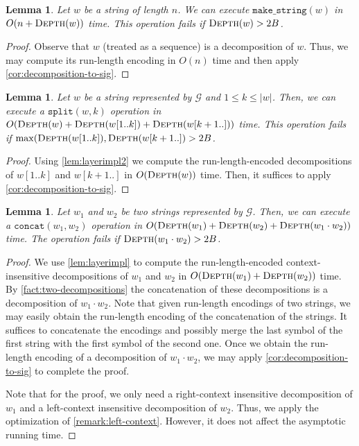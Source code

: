 \documentclass[a4paper]{article}
\newtheorem{lemma}[theorem]{Lemma}
\theoremstyle{remark}
\newcommand{\makeop}{\mathtt{make\_string}}
\newcommand{\concop}{\mathtt{concat}}
\newcommand{\splitop}{\mathtt{split}}
\newcommand{\depth}{\textsc{Depth}}
\newcommand{\str}{w}
\newcommand{\grammar}{\mathcal{G}}
\newcommand{\mword}{B}
\begin{document}
\begin{lemma}\label{lem:makeop}
Let $w$ be a string of length $n$.
We can execute $\makeop(w)$ in $O(n + \depth(\str))$ time.
This operation fails if $\depth(w) > 2\mword$.
\end{lemma}

\begin{proof}
Observe that $\str$ (treated as a sequence) is a decomposition of $\str$.
Thus, we may compute its run-length encoding in $O(n)$ time and then apply \cref{cor:decomposition-to-sig}.
\end{proof}

\begin{lemma}\label{lem:splitop}
Let $\str$ be a string represented by $\grammar$ and $1 \leq k \leq |\str|$.
Then, we can execute a $\splitop(\str, k)$ operation in $O(\depth(\str) + \depth(\str[1..k]) + \depth(\str[k+1..]))$ time.
This operation fails if $\max(\depth(\str[1..k]), \depth(\str[k+1..]) > 2\mword$.
\end{lemma}

\begin{proof}
Using \cref{lem:layerimpl2} we compute the run-length-encoded decompositions of $\str[1..k]$ and $\str[k+1..]$ in $O(\depth(\str))$ time.
Then, it suffices to apply \cref{cor:decomposition-to-sig}.
\end{proof}

\begin{lemma}\label{lem:concop}
Let $\str_1$ and $\str_2$ be two strings represented by $\grammar$.
Then, we can execute a $\concop(\str_1, \str_2)$ operation in $O(\depth(\str_1) + \depth(\str_2) +  \depth(\str_1 \cdot \str_2))$ time.
The operation fails if $\depth(\str_1 \cdot \str_2) > 2\mword$.
\end{lemma}

\begin{proof}
We use \cref{lem:layerimpl} to compute the run-length-encoded context-insensitive decompositions of $\str_1$ and $\str_2$ in $O(\depth(\str_1) + \depth(\str_2))$ time.
By \cref{fact:two-decompositions} the concatenation of these decompositions is a decomposition of $\str_1 \cdot \str_2$.
Note that given run-length encodings of two strings, we may easily obtain the run-length encoding of the concatenation of the strings.
It suffices to concatenate the encodings and possibly merge the last symbol of the first string with the first symbol of the second one.
Once we obtain the run-length encoding of a decomposition of $\str_1 \cdot \str_2$, we may apply \cref{cor:decomposition-to-sig} to complete the proof.

Note that for the proof, we only need a right-context insensitive decomposition of $\str_1$ and a left-context insensitive decomposition of $\str_2$.
Thus, we apply the optimization of \cref{remark:left-context}.
However, it does not affect the asymptotic running time.
\end{proof}
\end{document}
